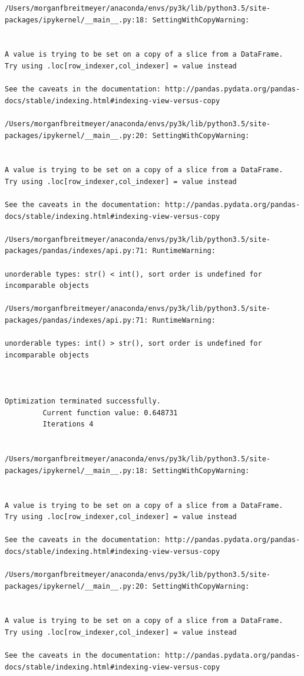 \begin{lstlisting}
/Users/morganfbreitmeyer/anaconda/envs/py3k/lib/python3.5/site-packages/ipykernel/__main__.py:18: SettingWithCopyWarning:


A value is trying to be set on a copy of a slice from a DataFrame.
Try using .loc[row_indexer,col_indexer] = value instead

See the caveats in the documentation: http://pandas.pydata.org/pandas-docs/stable/indexing.html#indexing-view-versus-copy

/Users/morganfbreitmeyer/anaconda/envs/py3k/lib/python3.5/site-packages/ipykernel/__main__.py:20: SettingWithCopyWarning:


A value is trying to be set on a copy of a slice from a DataFrame.
Try using .loc[row_indexer,col_indexer] = value instead

See the caveats in the documentation: http://pandas.pydata.org/pandas-docs/stable/indexing.html#indexing-view-versus-copy

/Users/morganfbreitmeyer/anaconda/envs/py3k/lib/python3.5/site-packages/pandas/indexes/api.py:71: RuntimeWarning:

unorderable types: str() < int(), sort order is undefined for incomparable objects

/Users/morganfbreitmeyer/anaconda/envs/py3k/lib/python3.5/site-packages/pandas/indexes/api.py:71: RuntimeWarning:

unorderable types: int() > str(), sort order is undefined for incomparable objects



Optimization terminated successfully.
         Current function value: 0.648731
         Iterations 4


/Users/morganfbreitmeyer/anaconda/envs/py3k/lib/python3.5/site-packages/ipykernel/__main__.py:18: SettingWithCopyWarning:


A value is trying to be set on a copy of a slice from a DataFrame.
Try using .loc[row_indexer,col_indexer] = value instead

See the caveats in the documentation: http://pandas.pydata.org/pandas-docs/stable/indexing.html#indexing-view-versus-copy

/Users/morganfbreitmeyer/anaconda/envs/py3k/lib/python3.5/site-packages/ipykernel/__main__.py:20: SettingWithCopyWarning:


A value is trying to be set on a copy of a slice from a DataFrame.
Try using .loc[row_indexer,col_indexer] = value instead

See the caveats in the documentation: http://pandas.pydata.org/pandas-docs/stable/indexing.html#indexing-view-versus-copy


\end{lstlisting}
